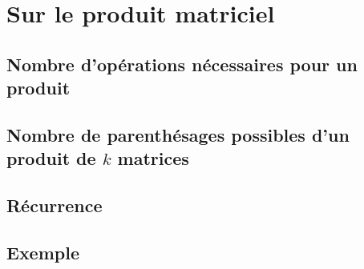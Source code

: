 
\section{Sur le produit matriciel}

\subsection{Nombre d'opérations nécessaires pour un produit}


\subsection{Nombre de parenthésages possibles d'un produit de $k$ matrices}


\subsection{Récurrence}


\subsection{Exemple}
